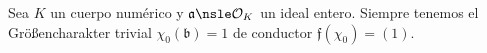 \documentclass[teoria-numeros.tex]{subfiles}
\begin{document}
\begin{ex}
	Sea $K$ un cuerpo numérico y $\mathfrak{a} \nsle \mathcal{O}_K$ un ideal entero.
	Siempre tenemos el Größencharakter trivial $\chi_0(\mathfrak{b}) = 1$ de conductor $\mathfrak{f}(\chi_0) = (1)$.
\end{ex}

\printbibliography[segment=\therefsegment, check=onlynew, notcategory=historical, notcategory=other]
\end{document}
